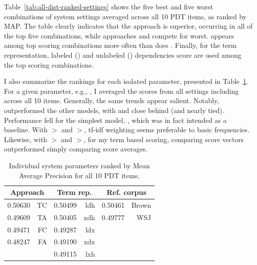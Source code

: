 Table~\ref{tab:all-dist-ranked-settings} shows the five best and five
worst combinations of system settings averaged across all 10 PDT items, as ranked by
MAP. The table clearly indicates that the  approach is superior, occurring in all of the top five combinations, while approaches  and  compete for worst.  appears among top scoring combinations more often than does . Finally, for the term representation, labeled () and unlabeled () dependencies score are used among the top scoring combinations.

I also summarize the rankings for each isolated parameter, presented in Table~\ref{tab:dist-ranked-parameters}. For a given parameter, e.g., , I averaged the scores from all settings including  across all 10 items. Generally, the same trends appear salient. Notably,  outperformed the other models, with  and  close behind (and nearly tied). Performance fell for the simplest model, , which was in fact intended as a baseline. With $>$ and $>$, tf-idf weighting seems preferable to basic frequencies. Likewise, with $>$ and $>$, for my term based scoring, comparing score vectors outperformed simply comparing score averages.

\begin{table}
\begin{center}
\begin{tabular}{|l|r||l|r||l|r|}
\hline
\multicolumn{2}{|c||}{Approach} & \multicolumn{2}{|c||}{Term rep.} & \multicolumn{2}{|c|}{Ref. corpus} \\
\hline
\hline
0.50630 & TC &0.50499 & ldh & 0.50461 & Brown \\
\hline
0.49609 & TA & 0.50405 & xdh & 0.49777 & WSJ \\
\hline
0.49471 & FC & 0.49287 & ldx & & \\
\hline
0.48247 & FA & 0.49190 & xdx & & \\
\hline
 & & 0.49115 & lxh & & \\
\hline
\end{tabular}
\caption{Individual system parameters ranked by Mean Average Precision for all 10 PDT items.}
\label{tab:dist-ranked-parameters}
\end{center}
\end{table}

